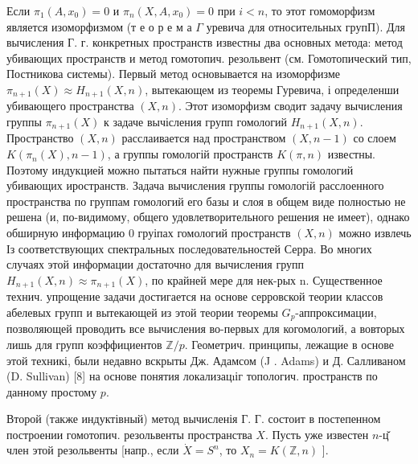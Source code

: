 \documentclass[10pt]{article}
\begin{document}
Если $\pi_{1}\left(A, x_{0}\right)=0$ и $\pi_{n}\left(X, A, x_{0}\right)=0$ при $i<n$, то этот гомоморфизм является изоморфизмом (т е о р е м а $\Gamma$ уревича для относительных групП). Для вычисления Г. г. конкретных пространств известны два основных метода: метод убивающих пространств и метод гомотопич. резольвент (см. Гомотопический тип, Постникова системы). Первый метод основывается на изоморфизме $\pi_{n+1}(X) \approx H_{n+1}(X, n)$, вытекающем из теоремы Гуревича, і определенши убивающего пространства $(X, n)$. Этот изоморфизм сводит задачу вычисления группы $\pi_{n+1}(X)$ к задаче вычісления групп гомологий $H_{n+1}(X, n)$. Пространство $(X, n)$ расслаивается над пространством $(X, n-1)$ со слоем $K\left(\pi_{n}(X), n-1\right)$, а группы гомологій пространств $K(\pi, n)$ известны. Поэтому индукцией можно пытаться найти нужные группы гомологий убивающих иространств. Задача вычисления группы гомологій расслоенного пространства по группам гомологий его базы и слоя в общем виде полностью не решена (и, по-видимому, общего удовлетворительного решения не имеет), однако обширную информацию 0 груіпах гомологий пространств $(X, n)$ можно извлечь Із соответствующих спектральных последовательностей Серра. Во многих случаях этой информации достаточно для вычисления групп $H_{n+1}(X, n) \approx \pi_{n+1}(X)$, по крайней мере для нек-рых n. Существенное технич. упрощение задачи достигается на основе серровской теории классов абелевых групп и вытекающей из этой теории теоремы $G_{p}$-аппроксимации, позволяющей проводить все вычисления во-первых для когомологий, а вовторых лишь для групп коэффициентов $\mathbb{Z} / p$. Геометрич. принципы, лежащие в основе этой техникі, были недавно вскрыты Дж. Адамсом (J . Adams) и Д. Салливаном (D. Sullivan) [8] на основе понятия локализацıіг топологич. пространств по данному простому $p$.



Второй (также индуктівный) метод вычисленія Г. Г. состоит в постепенном построении гомотопич. резольвенты пространства $X$. Пусть уже известен $n$-ц̆ член этой резольвенты [напр., если $\dot{X}=S^{n}$, то $X_{n}=K(\mathbb{Z}, n)$ ].
\end{document}
